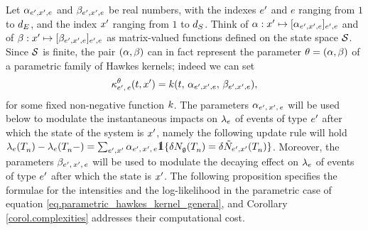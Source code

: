 \documentclass[10pt, article,table]{article}
\begin{document}
Let $\impCoef_{\eone,\xone, e}$ and $\decCoef_{\eone,\xone, e}$ be real numbers, with the indexes $\eone$ and $e$ ranging from $1$ to $\numEventTypes$, and the index $\xone$ ranging from $1$ to $\numStates$. Think of $\impCoef: \xone \mapsto [\impCoef_{\eone,\xone,e}]_{\eone,e}$ and of $\decCoef: \xone \mapsto [\decCoef_{\eone,\xone,e}]_{\eone,e}$ as matrix-valued functions defined on the state space $\stateSpace$. Since $\stateSpace$ is finite, the pair $(\impCoef,\decCoef)$ can in fact represent the parameter $\theta = (\impCoef,\decCoef)$ of a parametric family of Hawkes kernels; indeed we can set
\begin{equation}\label{eq.parametric_hawkes_kernel_general}
 \hawkesKernel^{\theta}\subscriptee(t,\xone)
 = \parametricHawkesKernel(t,\, \impCoef_{\eone,\xone,e},\, \decCoef_{\eone,\xone,e}),
\end{equation}
for some fixed non-negative function $\parametricHawkesKernel$. The parameters $\impCoef\subscriptexe$ will be used below to modulate the instantaneous impacts on $\intensity[e]$ of events of type $\eone$ after which the state of the system is $\xone$, namely the following update rule will hold $\intensity[e](\arrivalTimes[]_n) - \intensity[e](\arrivalTimes[]_n - ) = \sum_{\eone, \xone} \impCoef\subscriptexe \one \lbrace \delta\groundProc(\arrivalTimes[]_n) = \delta\hybridHawkes_{\eone,\xone}(\arrivalTimes[]_n)\rbrace$. Moreover, the parameters $\decCoef\subscriptexe$ will be used to modulate the decaying effect on $\intensity[e]$ of events of type $\eone$ after which the state is $\xone$.
The  following proposition specifies the formulae for the intensities and the log-likelihood in the parametric case of equation \eqref{eq.parametric_hawkes_kernel_general}, and Corollary \ref{corol.complexities} addresses their computational cost. 
\end{document}
